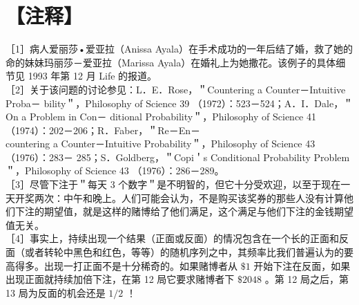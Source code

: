 \section*{【注释】}
［1］病人爱丽莎•爱亚拉（Anissa Ayala）在手术成功的一年后结了婚，救了她的命的妹妹玛丽莎－爱亚拉（Marissa Ayala）在婚礼上为她撒花。该例子的具体细节见 1993 年第 12 月 Life 的报道。\\
［2］关于该问题的讨论参见：L．E．Rose，＂Countering a Counter－Intuitive Proba－ bility＂，Philosophy of Science 39 （1972）：523－524；A．I．Dale，＂On a Problem in Con－ ditional Probability＂，Philosophy of Science 41 （1974）：202－206；R．Faber，＂Re－En－\\
countering a Counter－Intuitive Probability＂，Philosophy of Science 43 （1976）：283－ 285；S．Goldberg，＂Copi＇s Conditional Probability Problem＂，Philosophy of Science 43 （1976）：286－289。\\
［3］尽管下注于＂每天 3 个数字＂是不明智的，但它十分受欢迎，以至于现在一天开奖两次：中午和晚上。人们可能会认为，不是购买该奖券的那些人没有计算他们下注的期望值，就是这样的赌博给了他们满足，这个满足与他们下注的金钱期望值无关。\\
［4］事实上，持续出现一个结果（正面或反面）的情况包含在一个长的正面和反面（或者转轮中黑色和红色，等等）的随机序列之中，其频率比我们普遍认为的要高得多。出现一打正面不是十分稀奇的。如果赌博者从 $\$ 1$ 开始下注在反面，如果出现正面就持续加倍下注，在第 12 局它要求赌博者下 $\$ 2048$ 。第 12 局之后，第 13 局为反面的机会还是 $1 / 2$ ！ 